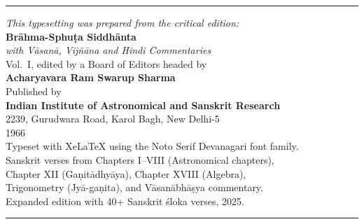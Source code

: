 \documentclass[11pt,a4paper]{article}
\newcommand{\longline}{\noindent\rule{\textwidth}{0.4pt}}
\begin{document}
\begin{center}
\longline
\vspace{0.5cm}

{\small\textit{This typesetting was prepared from the critical edition:}}\\[0.3cm]
{\small\textbf{Br\=ahma-Sphuṭa Siddh\=anta}}\\[0.1cm]
{\small\textit{with V\=asan\=a, Vij\~n\=ana and Hindi Commentaries}}\\[0.1cm]
{\small Vol.\ I, edited by a Board of Editors headed by}\\[0.1cm]
{\small\textbf{Acharyavara Ram Swarup Sharma}}\\[0.3cm]
{\small Published by}\\[0.1cm]
{\small\textbf{Indian Institute of Astronomical and Sanskrit Research}}\\[0.1cm]
{\small 2239, Gurudwara Road, Karol Bagh, New Delhi-5}\\[0.1cm]
{\small 1966}\\[0.5cm]

{\small Typeset with XeLaTeX using the Noto Serif Devanagari font family.}\\[0.1cm]
{\small Sanskrit verses from Chapters I--VIII (Astronomical chapters),}\\[0.1cm]
{\small Chapter XII (Gaṇitādhyāya), Chapter XVIII (Algebra),}\\[0.1cm]
{\small Trigonometry (Jyā-gaṇita), and Vāsanābhāṣya commentary.}\\[0.1cm]
{\small Expanded edition with 40+ Sanskrit śloka verses, 2025.}\\[0.3cm]

\vspace{0.5cm}
\longline
\end{center}
\end{document}
